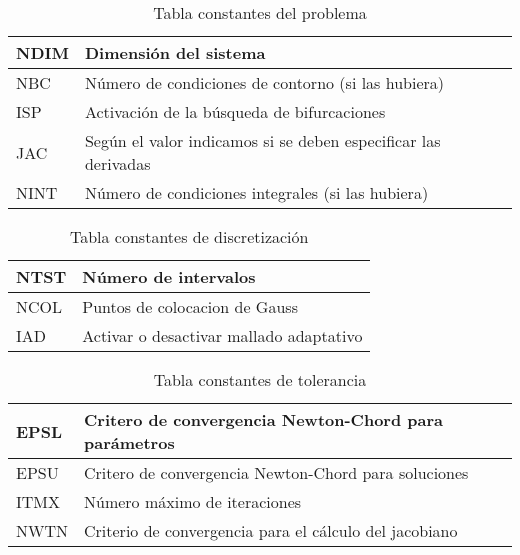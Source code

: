  \begin{table}[H]
 	\begin{center}
 		\begin{tabular}{|l|l|}
 			\hline
 			NDIM & Dimensión del sistema \\ \hline
 			NBC & Número de condiciones de contorno (si las hubiera) \\ \hline
 			ISP & Activación de la búsqueda de bifurcaciones  \\ \hline
 			JAC & Según el valor indicamos si se deben especificar las derivadas \\ \hline
 			NINT & Número de condiciones integrales (si las hubiera) \\ \hline
 		\end{tabular}
 		\caption{Tabla constantes del problema}
 		\label{c}
 	\end{center}
 \end{table}
 
 
 
  \begin{table}[h]
  	\begin{center}
  		\begin{tabular}{|l|l|}
  			\hline
  			NTST & Número de intervalos \\ \hline
  			NCOL & Puntos de colocacion de Gauss \\ \hline
  			IAD & Activar o desactivar mallado adaptativo \\ \hline
  		\end{tabular}
  		\caption{Tabla constantes de discretización}
  		\label{d}
  	\end{center}
  \end{table}
 
   \begin{table}[h]
   	\begin{center}
   		\begin{tabular}{|l|l|}
   			\hline
   			EPSL & Critero de convergencia Newton-Chord para parámetros \\ \hline
   			EPSU & Critero de convergencia Newton-Chord para soluciones \\ \hline
   			ITMX & Número máximo de iteraciones \\ \hline
   			NWTN & Criterio de convergencia para el cálculo del jacobiano\\ \hline
   		\end{tabular}
   		\caption{Tabla constantes de tolerancia}
   		\label{t}
   	\end{center}
   \end{table}
